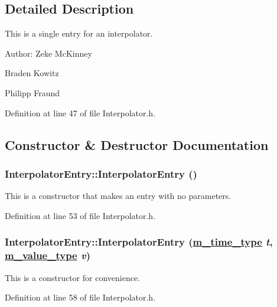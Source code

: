 \subsection{Detailed Description}
This is a single entry for an interpolator.

\begin{Desc}
\item[Author:]Zeke Mc\-Kinney 

Braden Kowitz 

Philipp Fraund \end{Desc}




Definition at line 47 of file Interpolator.h.

\subsection{Constructor \& Destructor Documentation}
\hypertarget{classInterpolatorEntry_a0}{
\subsubsection[InterpolatorEntry]{\setlength{\rightskip}{0pt plus 5cm}Interpolator\-Entry::Interpolator\-Entry ()}}
\label{classInterpolatorEntry_a0}


This is a constructor that makes an entry with no parameters. 

Definition at line 53 of file Interpolator.h.\hypertarget{classInterpolatorEntry_a1}{
\subsubsection[InterpolatorEntry]{\setlength{\rightskip}{0pt plus 5cm}Interpolator\-Entry::Interpolator\-Entry (\hyperlink{Types_8h_a2}{m\_\-time\_\-type} {\em t}, \hyperlink{Types_8h_a3}{m\_\-value\_\-type} {\em v})}}
\label{classInterpolatorEntry_a1}


This is a constructor for convenience. 

Definition at line 58 of file Interpolator.h.

